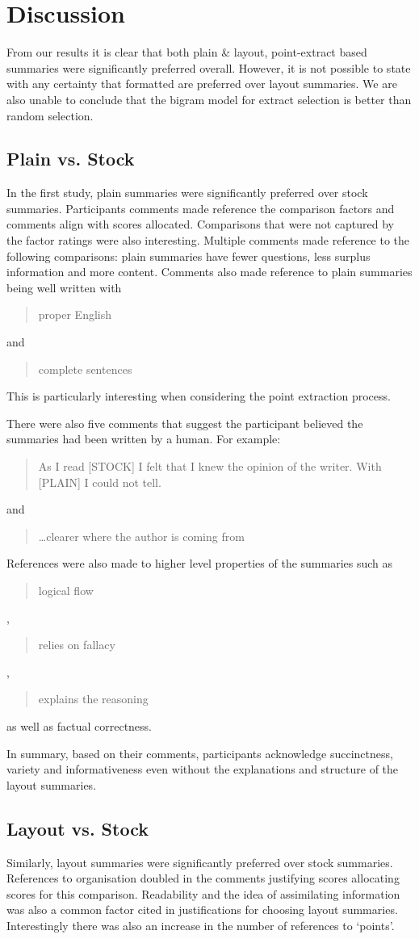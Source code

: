   \section{Discussion}
    From our results it is clear that both plain \& layout, point-extract based summaries were significantly preferred overall. However, it is not possible to state with any certainty that formatted are preferred over layout summaries. We are also unable to conclude that the bigram model for extract selection is better than random selection.

    \tocless\subsection{Plain vs. Stock}
      In the first study, plain summaries were significantly preferred over stock summaries. Participants comments made reference the comparison factors and comments align with scores allocated. Comparisons that were not captured by the factor ratings were also interesting. Multiple comments made reference to the following comparisons: plain summaries have fewer questions, less surplus information and more content. Comments also made reference to plain summaries being well written with \blockquote{proper English} and \blockquote{complete sentences}. This is particularly interesting when considering the point extraction process.

      There were also five comments that suggest the participant believed the summaries had been written by a human. For example: \blockquote{As I read [STOCK] I felt that I knew the opinion of the writer. With [PLAIN] I could not tell.} and \blockquote{\dots clearer where the author is coming from}. References were also made to higher level properties of the summaries such as \blockquote{logical flow}, \blockquote{relies on fallacy}, \blockquote{explains the reasoning} as well as factual correctness.

      In summary, based on their comments, participants acknowledge succinctness, variety and informativeness even without the explanations and structure of the layout summaries.

    \tocless\subsection{Layout vs. Stock}
      Similarly, layout summaries were significantly preferred over stock summaries. References to organisation doubled in the comments justifying scores allocating scores for this comparison. Readability and the idea of assimilating information was also a common factor cited in justifications for choosing layout summaries. Interestingly there was also an increase in the number of references to `points'.

